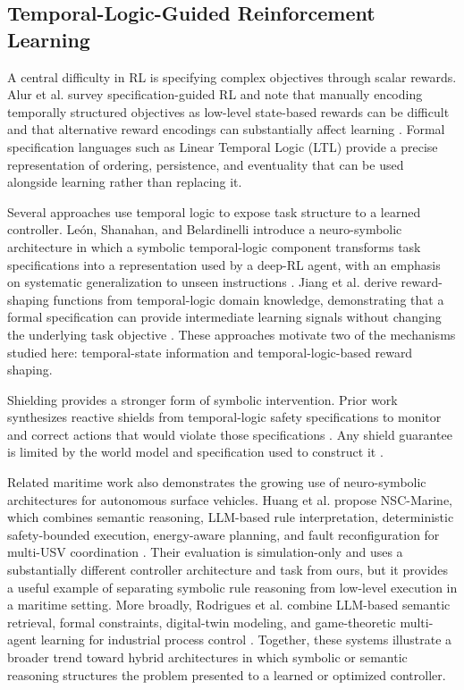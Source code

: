 \documentclass[letterpaper]{article}
\begin{document}
\subsection{Temporal-Logic-Guided Reinforcement Learning}

A central difficulty in RL is specifying complex objectives through scalar rewards. Alur et al. survey specification-guided RL and note that manually encoding temporally structured objectives as low-level state-based rewards can be difficult and that alternative reward encodings can substantially affect learning \cite{alur2026specification}. Formal specification languages such as Linear Temporal Logic (LTL) provide a precise representation of ordering, persistence, and eventuality that can be used alongside learning rather than replacing it.

Several approaches use temporal logic to expose task structure to a learned controller. León, Shanahan, and Belardinelli introduce a neuro-symbolic architecture in which a symbolic temporal-logic component transforms task specifications into a representation used by a deep-RL agent, with an emphasis on systematic generalization to unseen instructions \cite{leon2020systematic}. Jiang et al. derive reward-shaping functions from temporal-logic domain knowledge, demonstrating that a formal specification can provide intermediate learning signals without changing the underlying task objective \cite{jiang2021temporal}. These approaches motivate two of the mechanisms studied here: temporal-state information and temporal-logic-based reward shaping.

Shielding provides a stronger form of symbolic intervention. Prior work synthesizes reactive shields from temporal-logic safety specifications to monitor and correct actions that would violate those specifications \cite{alshiekh2018shielding}. Any shield guarantee is limited by the world model and specification used to construct it \cite{konighofer2025shields}.

Related maritime work also demonstrates the growing use of neuro-symbolic architectures for autonomous surface vehicles. Huang et al. propose NSC-Marine, which combines semantic reasoning, LLM-based rule interpretation, deterministic safety-bounded execution, energy-aware planning, and fault reconfiguration for multi-USV coordination \cite{huang2026nscmarine}. Their evaluation is simulation-only and uses a substantially different controller architecture and task from ours, but it provides a useful example of separating symbolic rule reasoning from low-level execution in a maritime setting. More broadly, Rodrigues et al. combine LLM-based semantic retrieval, formal constraints, digital-twin modeling, and game-theoretic multi-agent learning for industrial process control \cite{rodrigues2026agentic}. Together, these systems illustrate a broader trend toward hybrid architectures in which symbolic or semantic reasoning structures the problem presented to a learned or optimized controller.
\end{document}
